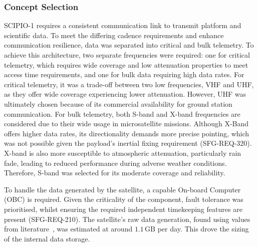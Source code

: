 \documentclass[a4paper, 11pt, conference]{IEEEtran}
\begin{document}
\subsubsection{Concept Selection}
SCIPIO-1 requires a consistent communication link to transmit platform and scientific data. To meet the differing cadence requirements and enhance communication resilience, data was separated into critical and bulk telemetry. To achieve this architecture, two separate frequencies were required: one for critical telemetry, which requires wide coverage and low attenuation properties to meet access time requirements, and one for bulk data requiring high data rates. For critical telemetry, it was a trade-off between two low frequencies, VHF and UHF, as they offer wide coverage experiencing lower attenuation. However, UHF was ultimately chosen because of its commercial availability for ground station communication. For bulk telemetry, both S-band and X-band frequencies are considered due to their wide usage in microsatellite missions. Although X-Band offers higher data rates, its directionality demands more precise pointing, which was not possible given the payload's inertial fixing requirement (SFG-REQ-320). X-band is also more susceptible to atmospheric attenuation, particularly rain fade, leading to reduced performance during adverse weather conditions. Therefore, S-band was selected for its moderate coverage and reliability. 





To handle the data generated by the satellite, a capable On-board Computer (OBC) is required. Given the criticality of the component, fault tolerance was prioritised, whilst ensuring the required independent timekeeping features are present (SFG-REQ-210). The satellite's raw data generation, found using values from literature~\cite{wertz_space_1999}, was estimated at around $1.1\,\mathrm{GB}$ per day. This drove the sizing of the internal data storage.
\end{document}
